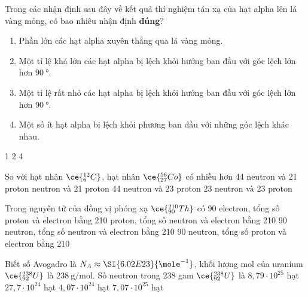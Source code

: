 \begin{ex}
	Trong các nhận định sau đây về kết quả thí nghiệm tán xạ của hạt alpha lên lá vàng mỏng, có bao nhiêu nhận định \textbf{đúng}?	
	\begin{enumerate}[label=(\arabic*)]
		\item Phần lớn các hạt alpha xuyên thẳng qua lá vàng mỏng.
		\item Một tỉ lệ khá lớn các hạt alpha bị lệch khỏi hướng ban đầu với góc lệch lớn hơn $\SI{90}{\degree}$.
		\item Một tỉ lệ rất nhỏ các hạt alpha bị lệch khỏi hướng ban đầu với góc lệch lớn hơn $\SI{90}{\degree}$.
		\item  Một số ít hạt alpha bị lệch khỏi phương ban đầu với những góc lệch khác nhau.
	\end{enumerate}
	\choice
	{1}
	{2}
	{}
	{4}
\end{ex}
\begin{ex}
	So với hạt nhân $\ce{_6^{12}C} $, hạt nhân $\ce{_{27}^{56}Co}$ có nhiều hơn
	\choice
	{44 neutron và 21 proton}
	{ neutron và 21 proton}
	{44 neutron và 23 proton}
	{23 neutron và 23 proton}
	\loigiai{}
\end{ex}
\begin{ex}
	Trong nguyên tử của đồng vị phóng xạ $\ce{_{90}^{210}Th}$ có
	\choice
	{90 electron, tổng số proton và electron bằng 210}
	{ proton, tổng số neutron và electron bằng 210}
	{90 neutron, tổng số neutron và electron bằng 210}
	{90 neutron, tổng số proton và electron bằng 210}
\end{ex}
\begin{ex}
	Biết số Avogadro là $N_{A} \approx\SI{6.02E23}{\mole^{-1}}$, khối lượng mol của uranium $\ce{_{92}^{238}U }$ là $\SI{238}{\gram/\mole}$. Số neutron trong 238 gam $\ce{_{92}^{238}U }$ là	
	\choice
	{\True $8,79\cdot10^{25}$ hạt}
	{$27,7\cdot10^{24}$ hạt}
	{ $4,07\cdot10^{24}$ hạt}
	{$7,07\cdot10^{25}$ hạt}
\end{ex}
